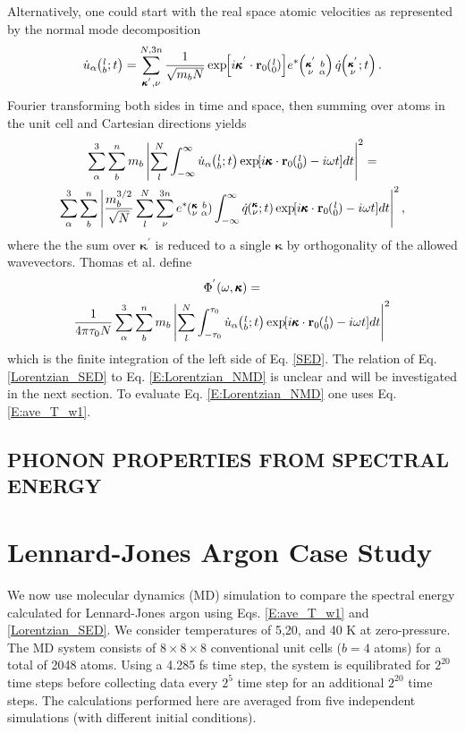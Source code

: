 \documentclass[twocolumn,10pt]{asme2e}
\newcommand{\SUMprime}[2]{\ifthenelse{\equal{#1}{0}}{\sum_{\alpha_{#2},b_{#2},l_{#2}}^{3,n,N}} {\ifthenelse{\equal{#1}{1}}{\sum_{\alpha_{#2},b_{#2}}^{3,n}}{\sum_{\pmb{\kappa}^{'}#2,\nu#2}^{N,3n}}}}
\newcommand{\EXP}[1]{\exp\mspace{-5.0mu}\left[#1\right]\mspace{-3.0mu}}
\newcommand{\ab}[2]{\mspace{-4.0mu}\left(\mspace{-8.0mu}\begin{smallmatrix}&\ifthenelse{\equal{#1}{}}{a}{#1} \\&\ifthenelse{\equal{#2}{}}{b}{#2}\end{smallmatrix}\mspace{-3.0mu}\right)}
\newcommand{\kvba}{\mspace{-4.0mu}\left(\mspace{-8.0mu}\begin{smallmatrix} &\pmb{\kappa} &b \\ &\nu &\alpha\end{smallmatrix}\mspace{-3.0mu}\right)}
\newcommand{\kpvba}{\mspace{-4.0mu}\left(\mspace{-8.0mu}\begin{smallmatrix} &\pmb{\kappa}^{'} &b \\ &\nu &\alpha\end{smallmatrix}\mspace{-3.0mu}\right)}
\newcommand{\kvt}{\mspace{-4.0mu}\left(\mspace{-8.0mu}\begin{smallmatrix}&\pmb{\kappa} \\&\nu\end{smallmatrix}\mspace{-2.0mu};t\right)}
\newcommand{\kpvt}{\mspace{-4.0mu}\left(\mspace{-8.0mu}\begin{smallmatrix}&\pmb{\kappa}^{'} \\&\nu\end{smallmatrix}\mspace{-2.0mu};t\right)}
\newcommand{\lbt}{\mspace{-4.0mu}\left(\mspace{-8.0mu}\begin{smallmatrix}&l \\&b\end{smallmatrix}\mspace{-2.0mu};t\right)}
\begin{document}
Alternatively, one could start with the real space atomic velocities as represented by the normal mode decomposition \cite{dove1993}
\begin{equation}\label{E:udot_HLD}
\dot{u}_{\alpha}\lbt =  \SUMprime{2}{} \frac{1}{\sqrt{m_bN}} \EXP{i\pmb{\kappa}^{'}\cdot\mathbf{r}_0\ab{l}{0}} e^*\kpvba \dot{q}\kpvt{}{}{}.
\end{equation}
Fourier transforming both sides in time and space, then summing over atoms in the unit cell and Cartesian directions yields
\begin{multline}\label{SED}
\sum_\alpha^3 \sum_b^n m_b \left| \sum_l^N  \int_{-\infty}^{\infty} \dot{u}_{\alpha}\lbt \EXP{i\pmb{\kappa}\cdot\mathbf{r}_0\ab{l}{0}-i\omega t} dt \right|^2 =
\\ \sum_\alpha^3 \sum_b^n\left| \frac{m_b^{3/2}}{\sqrt{N}} \sum_l^N \sum_{\nu}^{3n} e^*\kvba \int_{-\infty}^{\infty}\dot{q}\kvt\EXP{i\pmb{\kappa}\cdot\mathbf{r}_0\ab{l}{0}-i\omega t}dt\right|^2 ,
\end{multline}
where the the sum over $\pmb{\kappa}^{'}$ is reduced to a single $\pmb{\kappa}$ by orthogonality of the allowed wavevectors. Thomas et al. \cite{thomas2010c} define
\begin{multline}\label{Lorentzian_SED}
\Phi^{'}(\omega,\pmb{\kappa}) =
\\ \frac{1}{4\pi\tau_0N} \sum_\alpha^3 \sum_b^n m_b \left| \sum_l^N  \int_{-\tau_0}^{\tau_0} \dot{u}_{\alpha}\lbt \EXP{i\pmb{\kappa}\cdot\mathbf{r}_0\ab{l}{0}-i\omega t} dt \right|^2
\end{multline}
which is the finite integration of the left side of Eq$.$ \eqref{SED}. The relation of Eq$.$ \eqref{Lorentzian_SED} to Eq$.$ \eqref{E:Lorentzian_NMD} is unclear and will be investigated in the next section. To evaluate Eq$.$ \eqref{E:Lorentzian_NMD} one uses Eq$.$ \eqref{E:ave_T_w1}.

\subsection*{PHONON PROPERTIES FROM SPECTRAL ENERGY}\label{S:Properties}

\section*{Lennard-Jones Argon Case Study}\label{S:LJ_Case_study}

We now use molecular dynamics (MD) simulation to compare the spectral energy calculated for Lennard-Jones argon \cite{mcgaughey2004c} using Eqs$.$ \eqref{E:ave_T_w1} and \eqref{Lorentzian_SED}. We consider temperatures of 5,20, and 40 K at zero-pressure.  The MD system consists
of $8\times 8\times 8$ conventional unit cells ($b=4$ atoms) for a total of 2048 atoms.
Using a 4.285 fs time step, the system is equilibrated for $2^{20}$ time steps before collecting data every $2^5$ time step for an additional $2^{20}$ time steps. The calculations performed here are averaged from five independent simulations (with different initial conditions).
\end{document}
